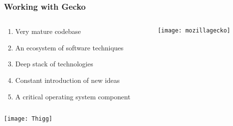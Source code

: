 \documentclass[
	notes=none,
	aspectratio=169
]{beamer}
\begin{document}
\begin{frame}
\frametitle{Working with Gecko}

\begin{columns}[T]
\begin{column}[T]{0.6\textwidth}
\setlength{\parskip}{0.5em}

\vspace{1.2cm}
\begin{enumerate}
\setlength{\parskip}{0.5em}
\item Very mature codebase
\item An ecosystem of software techniques
\item Deep stack of technologies
\item Constant introduction of new ideas
\item A critical operating system component
\end{enumerate}

\end{column}
\begin{column}[T]{0.4\textwidth}
\setlength{\parskip}{0.5em}

\vspace{0.5cm}
\texttt{[image: mozillagecko]}

\end{column}
\end{columns}

\end{frame}


\begin{frame}

\begin{columns}[T]
\begin{column}[T]{1.0\textwidth}

\vspace{-0.12cm}
\hspace*{-1.1cm}
\texttt{[image: Thigg]}

\end{column}
\end{columns}

\end{frame}
\end{document}
